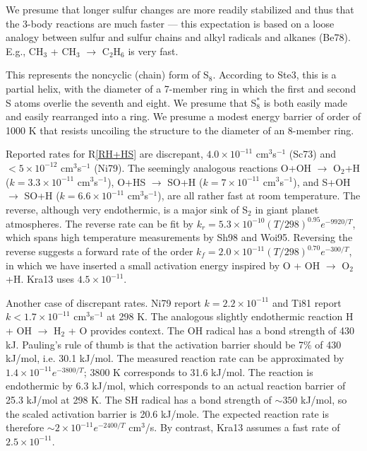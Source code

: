 \documentclass[12pt,landscape]{article}
\newcounter{reaction}
\begin{document}
  We presume that longer sulfur changes are more readily stabilized and thus that the 3-body reactions are much faster --- this expectation is based on a loose analogy between sulfur and sulfur chains and alkyl radicals and alkanes (Be78).  E.g., CH$_3$ + CH$_3$ $\rightarrow$ C$_2$H$_6$ is very fast.

  This represents the noncyclic (chain) form of S$_8$. 
According to Ste3, this is a partial helix, with the diameter of a 7-member ring in which the first and second S atoms overlie the seventh and eight.
 We presume that S$_8^{\ast}$ is both easily made and easily rearranged into a ring.
We presume a modest energy barrier of order of 1000 K that resists uncoiling the structure to the diameter of an 8-member ring. 
 
 
 Reported rates for R\ref{RH+HS} are discrepant, $4.0\times 10^{-11}$ cm$^{3}$s$^{-1}$ (Sc73) and $<\!5\times 10^{-12}$ cm$^{3}$s$^{-1}$ (Ni79).  The seemingly analogous reactions O+OH $\rightarrow$ O$_2$+H ($k=3.3\times 10^{-11}$ cm$^{3}$s$^{-1}$), O+HS $\rightarrow$ SO+H ($k=7\times 10^{-11}$ cm$^{3}$s$^{-1}$), and S+OH $\rightarrow$ SO+H ($k=6.6\times 10^{-11}$ cm$^{3}$s$^{-1}$), are all rather fast at room temperature. 
The reverse, although very endothermic, is a major sink of S$_2$ in giant planet atmospheres.
The reverse rate can be fit by $k_r=5.3\!\times\! 10^{-10}\left(T/298 \right)^{0.95} e^{-9920/T}$, which spans high temperature measurements by Sh98 and Woi95.
Reversing the reverse suggests a forward rate of the order 
 $k_f = 2.0\!\times\! 10^{-11}\left(T/298 \right)^{0.70}e^{-300/T}$, in which we have inserted a small activation energy inspired by O + OH $\rightarrow$ O$_2$ +H.
Kra13 uses $4.5\times 10^{-11}$.


  Another case of discrepant rates.  Ni79 report $k=2.2\times 10^{-11}$ and Ti81 report  $k<1.7\times 10^{-11}$ cm$^{3}$s$^{-1}$ at 298 K.  The analogous slightly endothermic reaction H + OH $\rightarrow$ H$_2$ + O provides context.
The OH radical has a bond strength of 430 kJ.  Pauling's rule of thumb is that the activation barrier should be 7\% of 430 kJ/mol, i.e. 30.1 kJ/mol.
The measured reaction rate can be approximated by $1.4\times 10^{-11} e^{-3800/T}$;  3800 K corresponds to 31.6 kJ/mol.
The reaction is endothermic by 6.3 kJ/mol, which corresponds to an actual reaction barrier of 25.3 kJ/mol at 298 K.
The SH radical has a bond strength of $\sim\!350$ kJ/mol, so the scaled activation barrier is 20.6 kJ/mole.
The expected reaction rate is therefore $\sim\!2\times 10^{-11} e^{-2400/T}$ cm$^3$/s.
By contrast, Kra13 assumes a fast rate of $2.5\times 10^{-11}$.
\end{document}
